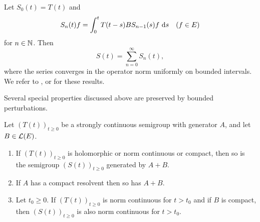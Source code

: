 Let $S_{0}(t) = T(t)$ and
\begin{equation}\label{eq:a2-1.10}
    S_{n}(t)f = \int_{0}^{t} T(t-s)BS_{n-1}(s)f\, \mathop{}\!\mathrm{d}{s} \quad (f \in E)
\end{equation}
for $n \in \mathbb{N}$. Then
\begin{equation}\label{eq:a2-1.11}
    S(t) = \sum_{n=0}^{\infty} S_{n}(t),
\end{equation}
where the series converges in the operator norm uniformly on bounded intervals.
We refer to \citet[III.1]{davies:1980}, \citet[I.6]{goldstein:1985a} or \citet[Chapter 3]{pazy:1983} for these results.

Several special properties discussed above are preserved by bounded perturbations.

\begin{theorem} \label{thm:a2-1.30}
Let $(T(t))_{t \geq 0}$ be a strongly continuous semigroup with generator $A$, and let $B \in \mathcal{L}(E)$.

\begin{enumerate}[\upshape(i)]
\item
If $(T(t))_{t \geq 0}$ is holomorphic or norm continuous or compact, then so is the semigroup 
$(S(t))_{t \geq 0}$ 
generated by $A+B$.

\item
If $A$ has a compact resolvent then so has $A+B$.

\item
Let $t_{0} \geq 0$.
If $(T(t))_{t \geq 0}$ is norm continuous for $t > t_{0}$ and if 
$B$ is compact, then $(S(t))_{t \geq 0}$ is also norm continuous for $t > t_{0}$.

\end{enumerate}

\end{theorem}
